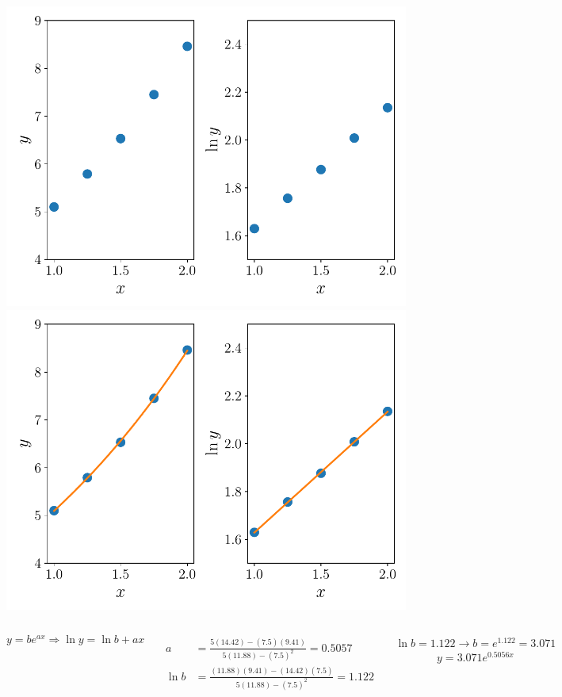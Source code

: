 \documentclass[9pt, aspectratio=169]{beamer}
\begin{document}
\begin{frame}
\begin{columns}
		\cx
		\begin{center}
			\begin{overprint}
				 \includegraphics[scale=0.4]{figs/fig-05.pdf}
				\onslide<3> \includegraphics[scale=0.4]{figs/fig-05b.pdf}
			\end{overprint}
		\end{center}
	\end{columns} \pause

	\begin{columns}
		\cx
		\[ y = b e^{ax} \Rightarrow \ln y = \ln b + a x \]

		\begin{align*}
			a     & = \frac{5 (14.42) - (7.5)(9.41)}{5 (11.88) - (7.5)^2} = 0.5057     \\
			\ln b & = \frac{(11.88)(9.41) - (14.42)(7.5)}{5 (11.88) - (7.5)^2} = 1.122
		\end{align*}

		\cx
		$\ln b = 1.122 \rightarrow b = e^{1.122} = 3.071$
		\[ y = 3.071 e^{0.5056 x} \]
	\end{columns}
\end{frame}
\end{document}

